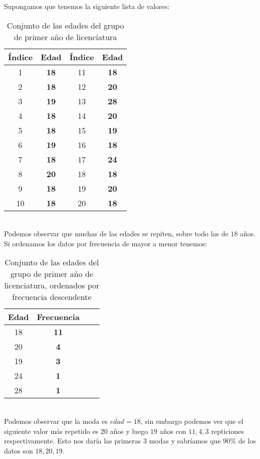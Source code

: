 \documentclass{article}
\begin{document}
Supongamos que tenemos la siguiente lista de valores:
\begin{table}[h!]
    \centering
    \begin{tabular}{|c|c|c|c|}
    \hline
    \textbf{Índice} & \textbf{Edad} & \textbf{Índice} & \textbf{Edad} \\ \hline
    1 & \textbf{18} & 11 & \textbf{18}  \\ \hline
    2 & \textbf{18} & 12 & \textbf{20}  \\ \hline
    3 & \textbf{19} & 13 & \textbf{28}  \\ \hline
    4 & \textbf{18} & 14 & \textbf{20}  \\ \hline
    5 & \textbf{18} & 15 & \textbf{19}  \\ \hline
    6 & \textbf{19} & 16 & \textbf{18}  \\ \hline
    7 & \textbf{18} & 17 & \textbf{24}  \\ \hline
    8 & \textbf{20} & 18 & \textbf{18}  \\ \hline
    9 & \textbf{18} & 19 & \textbf{20}  \\ \hline
    10 & \textbf{18} & 20 & \textbf{18}  \\ \hline
    \end{tabular}
    \caption{Conjunto de las edades del grupo de primer año de licenciatura}
\end{table}
\\
Podemos observar que muchas de las edades se repiten, sobre todo las de $18$ años.
\\[12pt]
Si ordenamos los datos por frecuencia de mayor a menor tenemos:
\begin{table}[h!]
    \centering
    \begin{tabular}{|c|c|c|c|}
    \hline
    \textbf{Edad} & \textbf{Frecuencia} \\ \hline
    18 & \textbf{11}  \\ \hline
    20 & \textbf{4}  \\ \hline
    19 & \textbf{3}  \\ \hline
    24 & \textbf{1}  \\ \hline
    28 & \textbf{1}  \\ \hline
    \end{tabular}
    \caption{Conjunto de las edades del grupo de primer año de licenciatura, ordenados por frecuencia descendente}
\end{table}
\\
Podemos observar que la moda es $\dot{edad} = 18$, sin embargo podemos ver que el siguiente valor más repetido es $20$ años y luego $19$ años con $11, 4, 3$ repticiones respectivamente. Esto nos daría las primeras 3 modas y sabríamos que $90\%$ de los datos son $18, 20, 19$.
\end{document}
